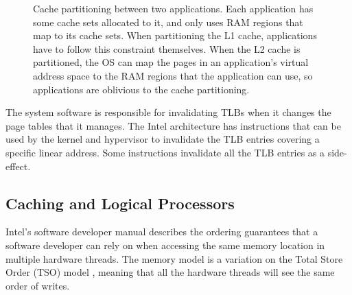 \begin{figure}[hbt]
  \caption{
    Cache partitioning between two applications. Each application has some
    cache sets allocated to it, and only uses RAM regions that map to its cache
    sets. When partitioning the L1 cache, applications have to follow this
    constraint themselves. When the L2 cache is partitioned, the OS can map the
    pages in an application's virtual address space to the RAM regions that the
    application can use, so applications are oblivious to the cache
    partitioning.
  }
  \label{fig:cache_partitions}
\end{figure}

The system software is responsible for invalidating TLBs when it changes the
page tables that it manages. The Intel architecture has instructions that can
be used by the kernel and hypervisor to invalidate the TLB entries covering a
specific linear address. Some instructions invalidate all the TLB entries as a
side-effect.


\subsection{Caching and Logical Processors}
\label{sec:cache_coherence}

Intel's software developer manual \cite{intel2014manual} describes the ordering
guarantees that a software developer can rely on when accessing the same memory
location in multiple hardware threads. The memory model is a variation on the
Total Store Order (TSO) model \cite{owens2009tso}, meaning that all the
hardware threads will see the same order of writes.

